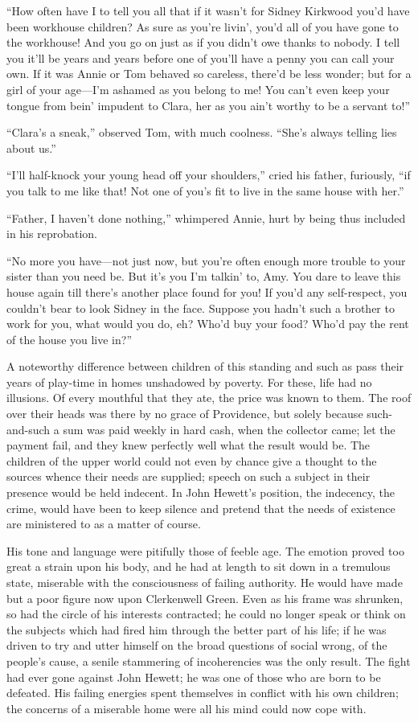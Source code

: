 ``How often have I to tell you all that if it wasn't for Sidney Kirkwood
you'd have been workhouse children? As sure as you're livin', you'd all
of you have gone to the workhouse! And you go on just as if you didn't
owe thanks to nobody. I tell you it'll be years and years before one of
you'll have a penny you can call your own. If it was Annie or Tom
behaved so careless, there'd be less wonder; but for a girl of your
age---I'm ashamed as you belong to me! You can't even keep your tongue
from bein' impudent to Clara, her as you ain't worthy to be a servant
to!''

``Clara's a sneak,'' observed Tom, with much coolness. ``She's always
telling lies about us.''

``I'll half-knock your young head off your shoulders,'' cried his
father, furiously, ``if you talk to me like that! Not one of you's fit
to live in the same house with her.''

``Father, I haven't done nothing,'' whimpered {}Annie, hurt by being
thus included in his reprobation.

``No more you have---not just now, but you're often enough more trouble
to your sister than you need be. But it's you I'm talkin' to, Amy. You
dare to leave this house again till there's another place found for you!
If you'd any self-respect, you couldn't bear to look Sidney in the face.
Suppose you hadn't such a brother to work for you, what would you do,
eh? Who'd buy your food? Who'd pay the rent of the house you live in?''

A noteworthy difference between children of this standing and such as
pass their years of play-time in homes unshadowed by poverty. For these,
life had no illusions. Of every mouthful that they ate, the price was
known to them. The roof over their heads was there by no grace of
Providence, but solely because such-and-such a sum was paid weekly in
hard cash, when the collector came; let the payment fail, and they knew
perfectly well what the result would be. The children of the upper world
could not even by chance give a thought to the sources whence their
needs are {}supplied; speech on such a subject in their presence would
be held indecent. In John Hewett's position, the indecency, the crime,
would have been to keep silence and pretend that the needs of existence
are ministered to as a matter of course.

His tone and language were pitifully those of feeble age. The emotion
proved too great a strain upon his body, and he had at length to sit
down in a tremulous state, miserable with the consciousness of failing
authority. He would have made but a poor figure now upon Clerkenwell
Green. Even as his frame was shrunken, so had the circle of his
interests contracted; he could no longer speak or think on the subjects
which had fired him through the better part of his life; if he was
driven to try and utter himself on the broad questions of social wrong,
of the people's cause, a senile stammering of incoherencies was the only
result. The fight had ever gone against John Hewett; he was one of those
who are born to be defeated. His failing energies spent themselves in
conflict with his own children; the concerns of a miserable home were
all his mind could now cope with.

